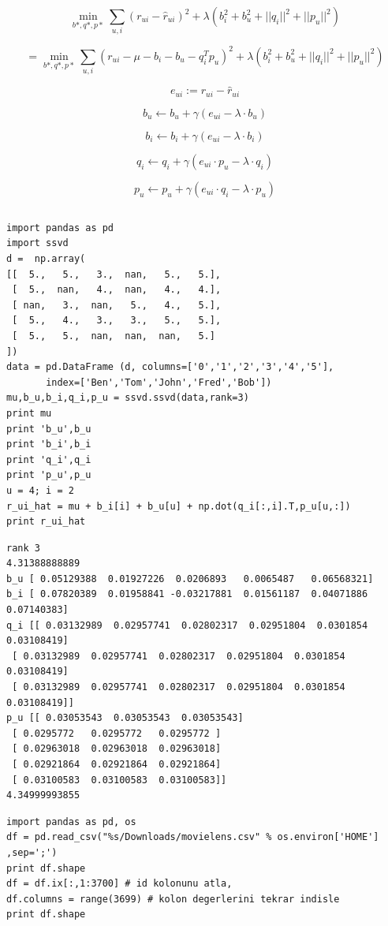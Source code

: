 \documentclass[12pt,fleqn]{article}\usepackage{../common}
\begin{document}
$$
\min_{b*,q*,p*} \sum_{u,i} (r_{ui} - \hat{r}_{ui})^2 + 
\lambda (b_i^2 + b_u^2 + ||q_i||^2 + ||p_u||^2)
$$

$$
= \min_{b*,q*,p*} \sum_{u,i} (r_{ui} - \mu - b_i - b_u - q_i^Tp_u)^2 + 
\lambda (b_i^2 + b_u^2 + ||q_i||^2 + ||p_u||^2)
$$


$$ e_{ui} := r_{ui} - \hat{r}_{ui} $$

$$
b_u \leftarrow b_u + \gamma (e_{ui} - \lambda \cdot b_u)
$$

$$
b_i \leftarrow b_i + \gamma (e_{ui} - \lambda \cdot b_i)
$$

$$
q_i \leftarrow q_i + \gamma (e_{ui}\cdot p_u - \lambda \cdot q_i)
$$

$$
p_u \leftarrow p_u + \gamma (e_{ui}\cdot q_i - \lambda \cdot p_u)
$$


\inputminted[fontsize=\footnotesize]{python}{ssvd.py}

\begin{verbatim}
import pandas as pd
import ssvd
d =  np.array(
[[  5.,   5.,   3.,  nan,   5.,   5.],
 [  5.,  nan,   4.,  nan,   4.,   4.],
 [ nan,   3.,  nan,   5.,   4.,   5.],
 [  5.,   4.,   3.,   3.,   5.,   5.],
 [  5.,   5.,  nan,  nan,  nan,   5.]
])
data = pd.DataFrame (d, columns=['0','1','2','3','4','5'],
       index=['Ben','Tom','John','Fred','Bob'])
mu,b_u,b_i,q_i,p_u = ssvd.ssvd(data,rank=3)
print mu
print 'b_u',b_u
print 'b_i',b_i
print 'q_i',q_i
print 'p_u',p_u
u = 4; i = 2
r_ui_hat = mu + b_i[i] + b_u[u] + np.dot(q_i[:,i].T,p_u[u,:])
print r_ui_hat
\end{verbatim}

\begin{verbatim}
rank 3
4.31388888889
b_u [ 0.05129388  0.01927226  0.0206893   0.0065487   0.06568321]
b_i [ 0.07820389  0.01958841 -0.03217881  0.01561187  0.04071886  0.07140383]
q_i [[ 0.03132989  0.02957741  0.02802317  0.02951804  0.0301854   0.03108419]
 [ 0.03132989  0.02957741  0.02802317  0.02951804  0.0301854   0.03108419]
 [ 0.03132989  0.02957741  0.02802317  0.02951804  0.0301854   0.03108419]]
p_u [[ 0.03053543  0.03053543  0.03053543]
 [ 0.0295772   0.0295772   0.0295772 ]
 [ 0.02963018  0.02963018  0.02963018]
 [ 0.02921864  0.02921864  0.02921864]
 [ 0.03100583  0.03100583  0.03100583]]
4.34999993855
\end{verbatim}


\begin{verbatim}
import pandas as pd, os
df = pd.read_csv("%s/Downloads/movielens.csv" % os.environ['HOME'] ,sep=';')
print df.shape
df = df.ix[:,1:3700] # id kolonunu atla,
df.columns = range(3699) # kolon degerlerini tekrar indisle
print df.shape
\end{verbatim}
\end{document}
